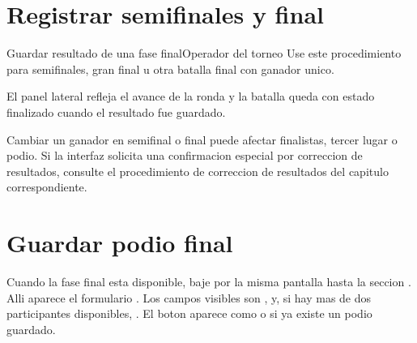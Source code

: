 \section{Registrar semifinales y final}


\begin{procedimiento}{Guardar resultado de una fase final}{Operador del torneo}
Use este procedimiento para semifinales, gran final u otra batalla final con ganador unico.
\end{procedimiento}


\begin{resultadoesperado}
El panel lateral  refleja el avance de la ronda y la batalla queda con estado finalizado cuando el resultado fue guardado.
\end{resultadoesperado}

\begin{advertencia}
Cambiar un ganador en semifinal o final puede afectar finalistas, tercer lugar o podio. Si la interfaz solicita una confirmacion especial por correccion de resultados, consulte el procedimiento de correccion de resultados del capitulo correspondiente.
\end{advertencia}

\section{Guardar podio final}

Cuando la fase final esta disponible, baje por la misma pantalla hasta la seccion . Alli aparece el formulario . Los campos visibles son ,  y, si hay mas de dos participantes disponibles, . El boton aparece como  o  si ya existe un podio guardado.

